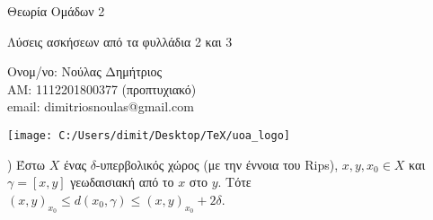 \documentclass[oneside,a4paper]{article}
\newcommand {\tl}{\textlatin}
\begin{document}
	
	
	\begin{framed}	
		\begin{center}
			\huge Θεωρία Ομάδων 2
		\end{center}
		\begin{center}
			 Λύσεις ασκήσεων από τα φυλλάδια 2 και 3
		\end{center}
		\vspace{0.3truecm}
		\begin{center}
			Ονομ/νο: Νούλας Δημήτριος\\
			ΑΜ: 1112201800377 (προπτυχιακό) \\
			\tl{email}: \tl{dimitriosnoulas@gmail.com}
		\end{center}
		\vspace{0.3truecm}
	\end{framed}
	\vspace*{\fill}
	\begin{center}
	\texttt{[image: C:/Users/dimit/Desktop/TeX/uoa\_logo]}
	\end{center}
\vspace{1cm}
\pagebreak

) Έστω $X$ ένας $\delta$-υπερβολικός χώρος (με την έννοια του \tl{Rips}), $x,y,x_0 \in X$ και $\gamma = [x,y]$ γεωδαισιακή από το $x$ στο $y$. Τότε $(x,y)_{x_0} \leq d(x_0,\gamma) \leq (x,y)_{x_0} + 2\delta$.
\end{document}
